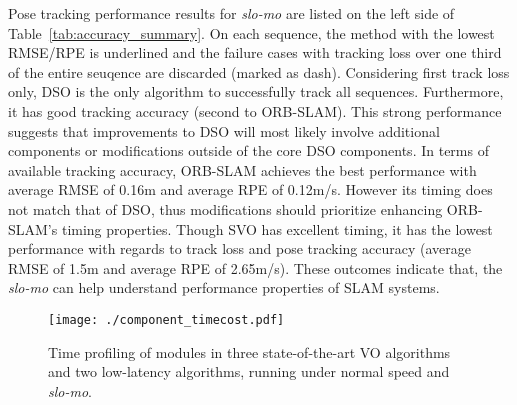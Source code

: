 Pose tracking performance results for \textit{slo-mo} are listed on 
the left side of Table~\ref{tab:accuracy_summary}. On each sequence, 
the method with the lowest RMSE/RPE is underlined and the failure cases 
with tracking loss over one third of the entire seuqence are discarded 
(marked as dash). 
Considering first track loss only, DSO is the only algorithm to
successfully track all sequences. Furthermore, it has good tracking
accuracy (second to ORB-SLAM). This strong performance suggests that
improvements to DSO will most likely involve additional components or
modifications outside of the core DSO components.
In terms of available tracking accuracy, ORB-SLAM achieves the best
performance with average RMSE of 0.16m and average RPE of 0.12m/s.  
However its timing does not match that of DSO, thus modifications should
prioritize enhancing ORB-SLAM's timing properties.
Though SVO has excellent timing, it has the lowest performance with
regards to track loss and pose tracking accuracy 
(average RMSE of 1.5m and average RPE of 2.65m/s).  
These outcomes indicate that, the \textit{slo-mo} can help understand 
performance properties of SLAM systems. 

\begin{figure}[t]
	\centering
	\texttt{[image: ./component\_timecost.pdf]} \\
	\caption{Time profiling of modules in three state-of-the-art VO algorithms and two low-latency algorithms, running under normal speed and \textit{slo-mo}.
 \label{fig:latency}}
\end{figure}





